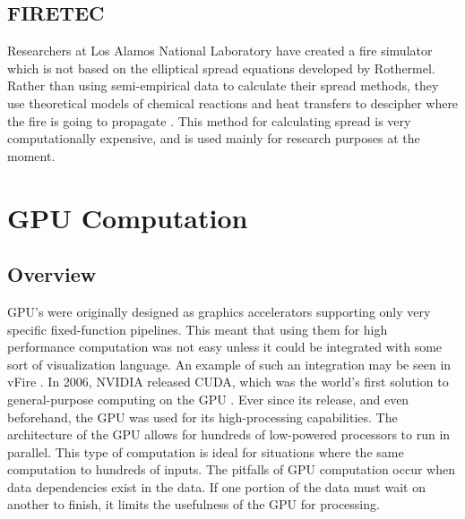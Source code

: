 \subsection{FIRETEC}
Researchers at Los Alamos National Laboratory have created a fire simulator which is not based on the elliptical spread equations developed by Rothermel. Rather than using semi-empirical data to calculate their spread methods, they use theoretical models of chemical reactions and heat transfers to descipher where the fire is going to propagate \cite{firetech}. This method for calculating spread is very computationally expensive, and is used mainly for research purposes at the moment. 

\section{GPU Computation}
\subsection{Overview}
GPU's were originally designed as graphics accelerators supporting only very specific fixed-function pipelines. This meant that using them for high performance computation was not easy unless it could be integrated with some sort of visualization language. An example of such an integration may be seen in vFire \cite{vFire}. In 2006, NVIDIA released CUDA, which was the world's first solution to general-purpose computing on the GPU \cite{cuda}. Ever since its release, and even beforehand, the GPU was used for its high-processing capabilities. The architecture of the GPU allows for hundreds of low-powered processors to run in parallel. This type of computation is ideal for situations where the same computation to hundreds of inputs. The pitfalls of GPU computation occur when data dependencies exist in the data. If one portion of the data must wait on another to finish, it limits the usefulness of the GPU for processing. 

